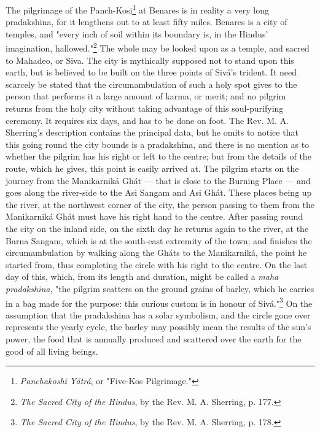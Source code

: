 \documentclass[a4paper, 11pt, oneside, polutonikogreek, english]{article}
\begin{document}
The pilgrimage of the Panch-Kosi\footnote{\emph{Panchakoshi Yátrá}, or "Five-Kos Pilgrimage."} at Benares is in reality a very long pradakshina, for it lengthens out to at least fifty miles. Benares is a city of temples, and "every inch of soil within its boundary is, in the Hindus' imagination, hallowed."\footnote{\emph{The Sacred City of the Hindus}, by the Rev. M. A. Sherring, p. 177.} The whole may be looked upon as a temple, and sacred to Mahadeo, or Siva. The city is mythically supposed not to stand upon this earth, but is believed to be built on the three points of Sivá's trident. It need scarcely be stated that the circumambulation of such a holy spot gives to the person that performs it a large amount of karma, or merit; and no pilgrim returns from the holy city without taking advantage of this soul-purifying ceremony. It requires six days, and has to be done on foot. The Rev. M. A. Sherring's description contains the principal data, but he omits to notice that this going round the city bounds is a pradakshina, and there is no mention as to whether the pilgrim has his right or left to the centre; but from the details of the route, which he gives, this point is easily arrived at. The pilgrim starts on the journey from the Manikarniká Ghát --- that is close to the Burning Place --- and goes along the river-side to the Asi Sangam and Asi Ghát. These places being up the river, at the northwest corner of the city, the person passing to them from the Manikarniká Ghát must have his right hand to the centre. After passing round the city on the inland side, on the sixth day he returns again to the river, at the Barna Sangam, which is at the south-east extremity of the town; and finishes the circumambulation by walking along the Gháts to the Manikarniká, the point he started from, thus completing the circle with his right to the centre. On the last day of this, which, from its length and duration, might be called a \emph{maha pradakshina}, "the pilgrim scatters on the ground grains of barley, which he carries in a bag made for the purpose: this curious custom is in honour of Sivá."\footnote{\emph{The Sacred City of the Hindus}, by the Rev. M. A. Sherring, p. 178.} On the assumption that the pradakshina has a solar symbolism, and the circle gone over represents the yearly cycle, the barley may possibly mean the results of the sun's power, the food that is annually produced and scattered over the earth for the good of all living beings.
\end{document}
